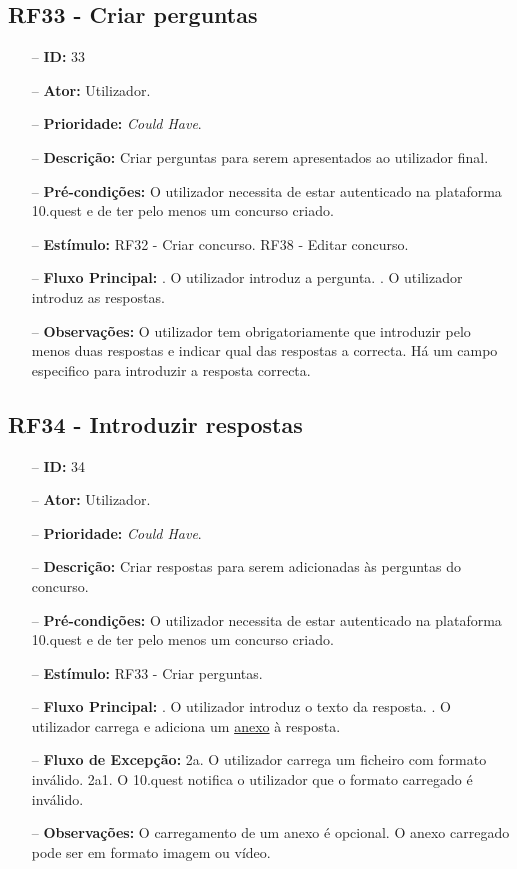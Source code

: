 \subsection{RF33 - Criar perguntas}
\begin{itemize}
	\item[--] \textbf{ID:} 33
	\item[--]  \textbf{Ator:} Utilizador.
	\item[--]  \textbf{Prioridade:} \textit{Could Have}.
	\item[--]  \textbf{Descrição:} Criar perguntas para serem apresentados ao utilizador final.
	\item[--]  \textbf{Pré-condições:} O utilizador necessita de estar autenticado na plataforma 10.quest e de ter pelo menos um concurso criado.
	\item[--]  \textbf{Estímulo:}  
	\subitem RF32 - Criar concurso.
	\subitem RF38 - Editar concurso.
	\item[--]  \textbf{Fluxo Principal:} 
	. O utilizador introduz a pergunta.
	. O utilizador introduz as respostas.
	\item[--]  \textbf{Observações:} O utilizador tem obrigatoriamente que introduzir pelo menos duas respostas e indicar qual das respostas a correcta. Há um campo especifico para introduzir a resposta correcta.
\end{itemize}
\newpage

\subsection{RF34 - Introduzir respostas}
\begin{itemize}
	\item[--] \textbf{ID:} 34
	\item[--]  \textbf{Ator:} Utilizador.
	\item[--]  \textbf{Prioridade:} \textit{Could Have}.
	\item[--]  \textbf{Descrição:} Criar respostas para serem adicionadas às perguntas do concurso.
	\item[--]  \textbf{Pré-condições:} O utilizador necessita de estar autenticado na plataforma 10.quest e de ter pelo menos um concurso criado.
	\item[--]  \textbf{Estímulo:} RF33 - Criar perguntas.
	\item[--]  \textbf{Fluxo Principal:} 
	. O utilizador introduz o texto da resposta.
	. O utilizador carrega e adiciona um \underline{anexo} à resposta.
	\item[--]  \textbf{Fluxo de Excepção:} 
	\subitem 2a. O utilizador carrega um ficheiro com formato inválido.
	\subitem 2a1. O 10.quest notifica o utilizador que o formato carregado é inválido.
	\item[--]  \textbf{Observações:} O carregamento de um anexo é opcional. O anexo carregado pode ser em formato imagem ou vídeo.
\end{itemize}
\newpage

